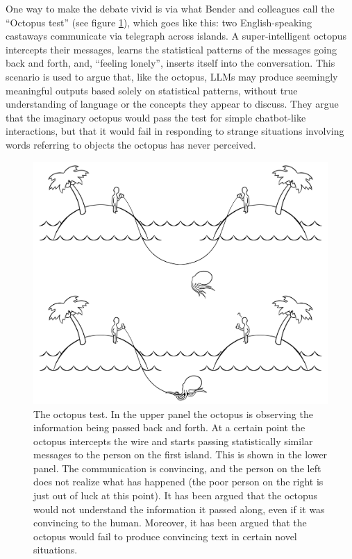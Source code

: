 One way to make the debate vivid is via what Bender and colleagues call the ``Octopus test'' \cite{bender2020climbing} (see figure \ref{octopusTest}), which goes like this: two English-speaking castaways communicate via telegraph across islands. A super-intelligent octopus intercepts their messages, learns the statistical patterns of the messages going back and forth, and, ``feeling lonely'', inserts itself into the conversation. This scenario is used to argue that, like the octopus, LLMs may produce seemingly meaningful outputs based solely on statistical patterns, without true understanding of language or the concepts they appear to discuss. They argue that the imaginary octopus would pass the test for simple chatbot-like interactions, but that it would fail in responding to strange situations involving words referring to objects the octopus has never perceived. 

\begin{figure}[h]
\centering
\includegraphics[scale=.20]{./images/octopusTest.png}
\caption[Soraya Boza.]{The octopus test. In the upper panel the octopus is observing the information being passed back and forth. At a certain point the octopus intercepts the wire and starts passing statistically similar messages to the person on the first island. This is shown in the lower panel. The communication is convincing, and the person on the left does not realize what has happened (the poor person on the right is just out of luck at this point). It has been argued that the octopus would not understand the information it passed along, even if it was convincing to the human. Moreover, it has been argued that the octopus would fail to produce convincing text in certain novel situations.}
\label{octopusTest}
\end{figure}


